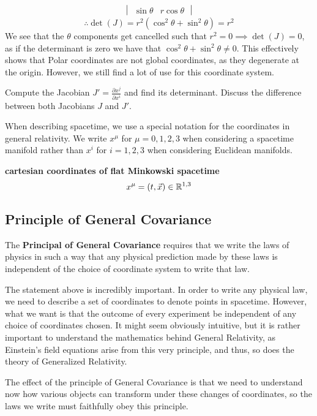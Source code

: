 \documentclass{article}
\begin{document}
\begin{exmp}
\begin{align*}
\begin{vmatrix}
 					\sin \theta & r\cos\theta
 				\end{vmatrix}
 			\end{align*}
 		\pagebreak
 			$$ \therefore \det(J) = r^2 \left( \cos^2 \theta + \sin^2 \theta \right) = r^2$$
 			We see that the $\theta$ components get cancelled such that $r^2 = 0 \implies \det(J) = 0$, as if the determinant is zero we have that $\cos^2 \theta + \sin^2 \theta \neq 0$. This effectively shows that Polar coordinates are not global coordinates, as they degenerate at the origin. However, we still find a lot of use for this coordinate system.
 			\begin{exe}
 				Compute the Jacobian $J' = \frac{\partial x^j}{\partial x^i}$ and find its determinant. Discuss the difference between both Jacobians $J$ and $J'$.
 			\end{exe}
 		\end{exmp}
 		When describing spacetime, we use a special notation for the coordinates in general relativity. We write $x^\mu$ for $\mu = 0,1,2,3$ when considering a spacetime manifold rather than $x^i$ for $i=1,2,3$ when considering Euclidean manifolds.
 		\begin{exmp}
 			\textbf{cartesian coordinates of flat Minkowski spacetime}
 			$$ x^\mu = (t, \vec{x}) \in \mathbb{R}^{1,3}$$
 		\end{exmp}
 	
 	\subsection{Principle of General Covariance}
 		\begin{defn}
 			The \textbf{Principal of General Covariance} requires that we write the laws of physics in such a way that any physical prediction made by these laws is independent of the choice of coordinate system to write that law.
 		\end{defn}
 		
 		The statement above is incredibly important. In order to write any physical law, we need to describe a set of coordinates to denote points in spacetime. However, what we want is that the outcome of every experiment be independent of any choice of coordinates chosen. It might seem obviously intuitive, but it is rather important to understand the mathematics behind General Relativity, as Einstein's field equations arise from this very principle, and thus, so does the theory of Generalized Relativity.
 		
 		The effect of the principle of General Covariance is that we need to understand now how various objects can transform under these changes of coordinates, so the laws we write must faithfully obey this principle. 
 		
\end{document}
